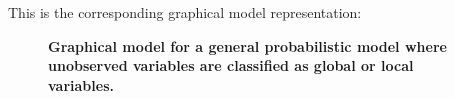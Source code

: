 This is the corresponding graphical model representation:

\begin{figure}[H]
	\centering	
	
	\caption{\textbf{Graphical model for a general probabilistic model where unobserved variables are classified as global or local variables.}\\
	}
	\label{fig:graphical_model_stochastic}
\end{figure}





